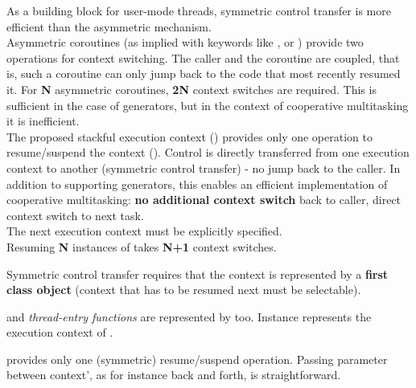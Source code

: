 As a building block for user-mode threads, symmetric control transfer is more
efficient than the asymmetric mechanism.\\
\newline
Asymmetric coroutines (as implied with keywords like \resumable, \await or
\yield) provide two operations for context switching. The caller and the
coroutine are coupled, that is, such a coroutine can only jump back to the code
that most recently resumed it.
For {\bfseries N} asymmetric coroutines, {\bfseries 2N} context switches are
required. This is sufficient in the case of generators, but in the context of
cooperative multitasking it is inefficient.\\
\newline
The proposed stackful execution context (\ectx) provides only one operation to
resume/suspend the context (\ectxop). Control is directly transferred from one
execution context to another (symmetric control transfer) - no jump back to
the caller. In addition to supporting generators, this enables an efficient
implementation of cooperative multitasking: {\bfseries no additional context
switch} back to caller, direct context switch to next task.\\
The next execution context must be explicitly specified.\\
\newline
{}
Resuming {\bfseries N} instances of \ectx takes {\bfseries N+1} context
switches.

Symmetric control transfer requires that the context is represented by a
{\bfseries first class object} (context that has to be resumed next must be
selectable).

\main and \emph{thread-entry functions} are represented by \ectx too.
Instance  represents the execution context of \main.


 provides only one (symmetric) resume/suspend operation.
Passing parameter between context', as for instance back and forth, is
straightforward.

